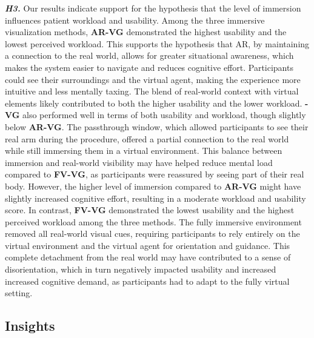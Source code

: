 \textbf{\textit{H3.}} Our results indicate support for the hypothesis that the level of immersion influences patient workload and usability. Among the three immersive visualization methods, \textbf{AR-VG} demonstrated the highest usability and the lowest perceived workload. This supports the hypothesis that AR, by maintaining a connection to the real world, allows for greater situational awareness, which makes the system easier to navigate and reduces cognitive effort. Participants could see their surroundings and the virtual agent, making the experience more intuitive and less mentally taxing. The blend of real-world context with virtual elements likely contributed to both the higher usability and the lower workload.
\textbf{-VG} also performed well in terms of both usability and workload, though slightly below \textbf{AR-VG}. The passthrough window, which allowed participants to see their real arm during the procedure, offered a partial connection to the real world while still immersing them in a virtual environment. This balance between immersion and real-world visibility may have helped reduce mental load compared to \textbf{FV-VG}, as participants were reassured by seeing part of their real body. However, the higher level of immersion compared to \textbf{AR-VG} might have slightly increased cognitive effort, resulting in a moderate workload and usability score.
In contrast, \textbf{FV-VG} demonstrated the lowest usability and the highest perceived workload among the three methods. The fully immersive environment removed all real-world visual cues, requiring participants to rely entirely on the virtual environment and the virtual agent for orientation and guidance. This complete detachment from the real world may have contributed to a sense of disorientation, which in turn negatively impacted usability and increased increased cognitive demand, as participants had to adapt to the fully virtual setting.


\subsection{Insights}


